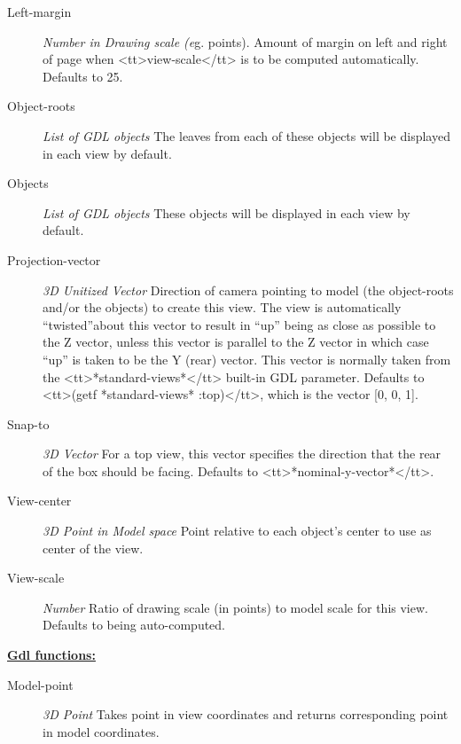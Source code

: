 \documentclass [11pt]{book}
\begin{document}
\begin{itemize}
\begin{description}
\item [Left-margin]
\emph{Number in Drawing scale (e}g. points). Amount of margin on left and right
of page when <tt>view-scale</tt> is to be computed automatically. Defaults to 25.


\item [Object-roots]
\emph{List of GDL objects} The leaves from each of these objects will be displayed in each view by default.


\item [Objects]
\emph{List of GDL objects} These objects will be displayed in each view by default.


\item [Projection-vector]
\emph{3D Unitized Vector} Direction of camera pointing to model (the object-roots and/or the objects) to create
this view. The view is automatically ``twisted''about this vector to result in ``up'' being as close as
possible to the Z vector, unless this vector is parallel to the Z vector in which case ``up'' is taken
to be the Y (rear) vector. This vector is normally taken from the <tt>*standard-views*</tt> built-in GDL
parameter. Defaults to <tt>(getf *standard-views* :top)</tt>, which is the vector [0, 0, 1].


\item [Snap-to]
\emph{3D Vector} For a top view, this vector specifies the direction that the rear of
the box should be facing. Defaults to <tt>*nominal-y-vector*</tt>.


\item [View-center]
\emph{3D Point in Model space} Point relative to each object's center to use as center of the view.


\item [View-scale]
\emph{Number} Ratio of drawing scale (in points) to model scale for this view. Defaults to being auto-computed.


\end{description}






\textbf{
\underline{Gdl functions:}}

\begin{description}

\item [Model-point]
\emph{3D Point} Takes point in view coordinates and returns corresponding point in model coordinates.



\end{description}
\end{itemize}
\end{document}
